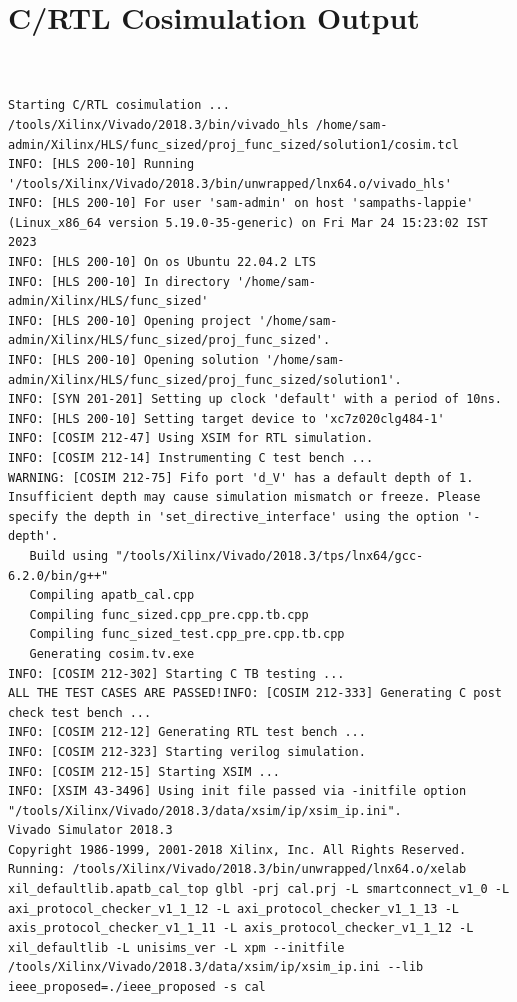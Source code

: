 \documentclass{article}
\begin{document}
\section{C/RTL Cosimulation Output}
\vspace{1cm}
\begin{lstlisting}


Starting C/RTL cosimulation ...
/tools/Xilinx/Vivado/2018.3/bin/vivado_hls /home/sam-admin/Xilinx/HLS/func_sized/proj_func_sized/solution1/cosim.tcl
INFO: [HLS 200-10] Running '/tools/Xilinx/Vivado/2018.3/bin/unwrapped/lnx64.o/vivado_hls'
INFO: [HLS 200-10] For user 'sam-admin' on host 'sampaths-lappie' (Linux_x86_64 version 5.19.0-35-generic) on Fri Mar 24 15:23:02 IST 2023
INFO: [HLS 200-10] On os Ubuntu 22.04.2 LTS
INFO: [HLS 200-10] In directory '/home/sam-admin/Xilinx/HLS/func_sized'
INFO: [HLS 200-10] Opening project '/home/sam-admin/Xilinx/HLS/func_sized/proj_func_sized'.
INFO: [HLS 200-10] Opening solution '/home/sam-admin/Xilinx/HLS/func_sized/proj_func_sized/solution1'.
INFO: [SYN 201-201] Setting up clock 'default' with a period of 10ns.
INFO: [HLS 200-10] Setting target device to 'xc7z020clg484-1'
INFO: [COSIM 212-47] Using XSIM for RTL simulation.
INFO: [COSIM 212-14] Instrumenting C test bench ...
WARNING: [COSIM 212-75] Fifo port 'd_V' has a default depth of 1. Insufficient depth may cause simulation mismatch or freeze. Please specify the depth in 'set_directive_interface' using the option '-depth'.
   Build using "/tools/Xilinx/Vivado/2018.3/tps/lnx64/gcc-6.2.0/bin/g++"
   Compiling apatb_cal.cpp
   Compiling func_sized.cpp_pre.cpp.tb.cpp
   Compiling func_sized_test.cpp_pre.cpp.tb.cpp
   Generating cosim.tv.exe
INFO: [COSIM 212-302] Starting C TB testing ... 
ALL THE TEST CASES ARE PASSED!INFO: [COSIM 212-333] Generating C post check test bench ...
INFO: [COSIM 212-12] Generating RTL test bench ...
INFO: [COSIM 212-323] Starting verilog simulation. 
INFO: [COSIM 212-15] Starting XSIM ...
INFO: [XSIM 43-3496] Using init file passed via -initfile option "/tools/Xilinx/Vivado/2018.3/data/xsim/ip/xsim_ip.ini".
Vivado Simulator 2018.3
Copyright 1986-1999, 2001-2018 Xilinx, Inc. All Rights Reserved.
Running: /tools/Xilinx/Vivado/2018.3/bin/unwrapped/lnx64.o/xelab xil_defaultlib.apatb_cal_top glbl -prj cal.prj -L smartconnect_v1_0 -L axi_protocol_checker_v1_1_12 -L axi_protocol_checker_v1_1_13 -L axis_protocol_checker_v1_1_11 -L axis_protocol_checker_v1_1_12 -L xil_defaultlib -L unisims_ver -L xpm --initfile /tools/Xilinx/Vivado/2018.3/data/xsim/ip/xsim_ip.ini --lib ieee_proposed=./ieee_proposed -s cal 

\end{lstlisting}
\end{document}
